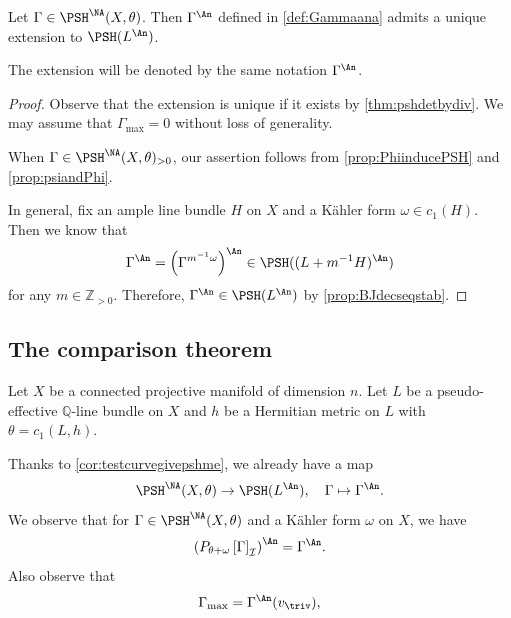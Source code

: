 \begin{corollary}\label{cor:testcurvegivepshme}
Let $\Gamma\in \PSH^{\NA}(X,\theta)$. Then $\Gamma^{\An}$ defined in \cref{def:Gammaana} admits a unique extension to $\PSH(L^{\An})$.
\end{corollary}
The extension will be denoted by the same notation $\Gamma^{\An}$.

\begin{proof}
Observe that the extension is unique if it exists by \cref{thm:pshdetbydiv}. We may assume that $\Gamma_{\max}=0$ without loss of generality.

When $\Gamma\in \PSH^{\NA}(X,\theta)_{>0}$, our assertion follows from \cref{prop:PhiinducePSH} and \cref{prop:psiandPhi}.

In general, fix an ample line bundle $H$ on $X$ and a K\"ahler form $\omega\in c_1(H)$. Then we know that
\[
\Gamma^{\An}=\left(\Gamma^{m^{-1}\omega}\right)^{\An}\in \PSH((L+m^{-1}H)^{\An})
\]
for any $m\in \mathbb{Z}_{>0}$. Therefore, $\Gamma^{\An}\in \PSH(L^{\An})$ by \cref{prop:BJdecseqstab}.
\end{proof}

\subsection{The comparison theorem}
\label{subsec:NA_comparison}
Let $X$ be a connected projective manifold of dimension $n$. Let $L$ be a pseudo-effective $\mathbb{Q}$-line bundle on $X$ and $h$ be a Hermitian metric on $L$ with $\theta=c_1(L,h)$.

Thanks to \cref{cor:testcurvegivepshme}, we already have a map
\begin{equation}\label{eq:analymap}
    \PSH^{\NA}(X,\theta)\rightarrow \PSH(L^{\An}),\quad \Gamma\mapsto \Gamma^{\An}.
\end{equation}
We observe that for $\Gamma\in \PSH^{\NA}(X,\theta)$ and a K\"ahler form $\omega$ on $X$, we have
\begin{equation}\label{eq:proj_NA_an_invariance}
\left( P_{\theta+\omega}\left[  \Gamma \right]_{\mathcal{I}} \right)^{\An}=\Gamma^{\An}.
\end{equation}
Also observe that
\begin{equation}\label{eq:Gammamax}
    \Gamma_{\max}=\Gamma^{\An}(v_{\triv}),
\end{equation}


